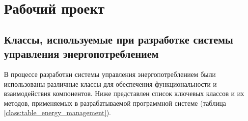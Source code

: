 \section{Рабочий проект}
\subsection{Классы, используемые при разработке системы управления энергопотреблением}

В процессе разработки системы управления энергопотреблением были использованы различные классы для обеспечения функциональности и взаимодействия компонентов. Ниже представлен список ключевых классов и их методов, применяемых в разрабатываемой программной системе (таблица \ref{class:table_energy_management}).

\renewcommand{\arraystretch}{0.8} %
